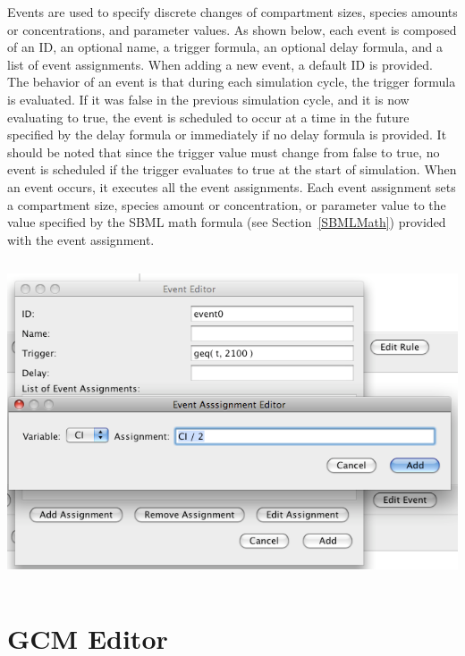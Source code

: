 \documentclass[titlepage,11pt]{article}
\begin{document}
\noindent
Events are used to specify discrete changes of compartment sizes, 
species amounts or concentrations, and parameter values.  
As shown below, each event 
is composed of an ID, an optional name, a trigger formula, an optional
delay formula, and a list of event assignments.  When adding a new
event, a default ID is provided.  The behavior of an event is that during 
each simulation cycle, the trigger formula is evaluated.  If it was false
in the previous simulation cycle, and it is now evaluating to true,
the event is scheduled to occur at a time in the future specified by 
the delay formula or immediately if no delay formula is provided.  
It should be noted that since the trigger value must change from false
to true, no event is scheduled if the trigger evaluates to true at the 
start of simulation.  When an event occurs, it executes all the event 
assignments.  Each event assignment sets a compartment size, species 
amount or concentration, or parameter value to the value specified by
the SBML math formula (see Section~\ref{SBMLMath}) provided with the event
assignment.  
\begin{center}
\includegraphics[height=95mm]{screenshots/event}
\end{center}

\clearpage

\section{\label{GCMEdit}GCM Editor}
\end{document}

